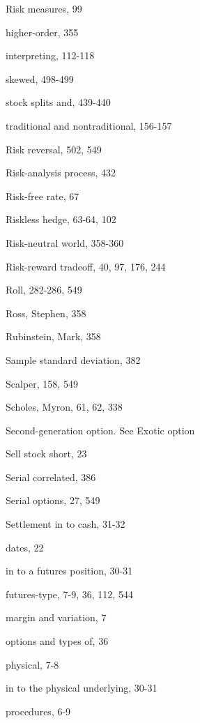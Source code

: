 \noindent Risk measures, 99\par
\noindent higher-order, 355\par
\noindent interpreting, 112-118\par
\noindent skewed, 498-499\par
\noindent stock splits and, 439-440\par
\noindent traditional and nontraditional, 156-157\par
\noindent Risk reversal, 502, 549\par
\noindent Risk-analysis process, 432\par
\noindent Risk-free rate, 67\par
\noindent Riskless hedge, 63-64, 102\par
\noindent Risk-neutral world, 358-360\par
\noindent Risk-reward tradeoff, 40, 97, 176, 244\par
\noindent Roll, 282-286, 549\par
\noindent Ross, Stephen, 358\par
\noindent Rubinstein, Mark, 358\par
\noindent Sample standard deviation, 382\par
\noindent Scalper, 158, 549\par
\noindent Scholes, Myron, 61, 62, 338\par
\noindent Second-generation option. See Exotic option\par
\noindent Sell stock short, 23\par
\noindent Serial correlated, 386\par
\noindent Serial options, 27, 549\par
\noindent Settlement in to cash, 31-32\par
\noindent dates, 22\par
\noindent in to a futures position, 30-31\par
\noindent futures-type, 7-9, 36, 112, 544\par
\noindent margin and variation, 7\par
\noindent options and types of, 36\par
\noindent physical, 7-8\par
\noindent in to the physical underlying, 30-31\par
\noindent procedures, 6-9\par

